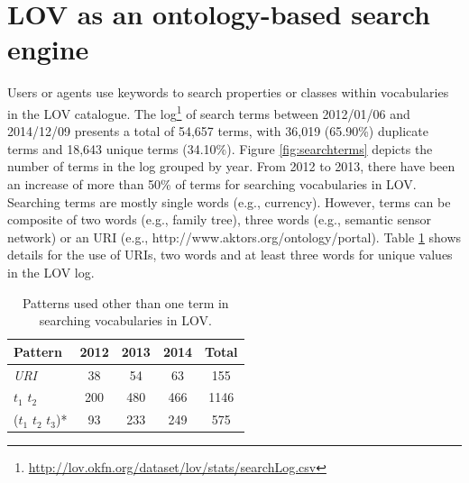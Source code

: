\documentclass{iosart2c}
\begin{document}
\section{LOV as an ontology-based search engine}
\label{sec:ontoSearch}
Users or agents use keywords to search properties or classes within vocabularies in the LOV catalogue. The log\footnote{\url{http://lov.okfn.org/dataset/lov/stats/searchLog.csv}} of search terms between 2012/01/06 and 2014/12/09 presents a total of 54,657 terms, with 36,019 (65.90\%) duplicate terms and 18,643 unique terms (34.10\%). Figure \ref{fig:searchterms} depicts the number of terms in the log grouped by year. From 2012 to 2013, there have been an increase of more than 50\% of terms for searching vocabularies in LOV. Searching terms are mostly single words (e.g., currency). However, terms can be composite of two words (e.g., family tree), three words (e.g., semantic sensor network) or an URI (e.g., http://www.aktors.org/ontology/portal). Table \ref{tab:patterns } shows details for the use of URIs, two words and at least three words for unique values in the LOV log.


\begin{table}[h!tb]
\caption{Patterns used other than one term in searching vocabularies in LOV.}
\begin{tabular}{lcccc}
\hline
\textbf{Pattern} & \textbf{2012} & \textbf{2013} & \textbf{2014} & \textbf{Total} \\ \hline
\textit{URI}  & 38   &  54  & 63  &  155      \\
$t_{1}$ $t_{2}$ & 200 & 480 & 466 & 1146 \\
($t_{1}$ $t_{2}$ $t_{3}$)* & 93 & 233 & 249 & 575\\
\hline  

\end{tabular}
\label{tab:patterns }
\end{table}

\begin{figure}[!htbp]
\end{figure}
\end{document}
